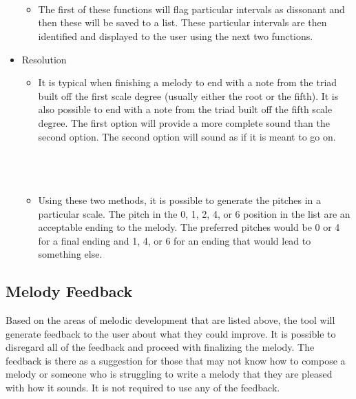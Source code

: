 \begin{itemize}
\begin{itemize}
		 \\
		 \\
		 \\
		\item The first of these functions will flag particular intervals as dissonant and then these will be saved to a list.  These particular intervals are then identified and displayed to the user using the next two functions.
	\end{itemize}
	\item Resolution
	\begin{itemize}
		\item It is typical when finishing a melody to end with a note from the triad built off the first scale degree (usually either the root or the fifth).  It is also possible to end with a note from the triad built off the fifth scale degree.  The first option will provide a more complete sound than the second option.  The second option will sound as if it is meant to go on. \\ \\
		 \\
		 \\
		\item Using these two methods, it is possible to generate the pitches in a particular scale.  The pitch in the 0, 1, 2, 4, or 6 position in the list are an acceptable ending to the melody.  The preferred pitches would be 0 or 4 for a final ending and 1, 4, or 6 for an ending that would lead to something else.
	\end{itemize}
\end{itemize}

\subsection{Melody Feedback}
\label{subsec:melodyfeedback}

Based on the areas of melodic development that are listed above, the tool will generate feedback to the user about what they could improve.  It is possible to disregard all of the feedback and proceed with finalizing the melody.  The feedback is there as a suggestion for those that may not know how to compose a melody or someone who is struggling to write a melody that they are pleased with how it sounds.  It is not required to use any of the feedback.

